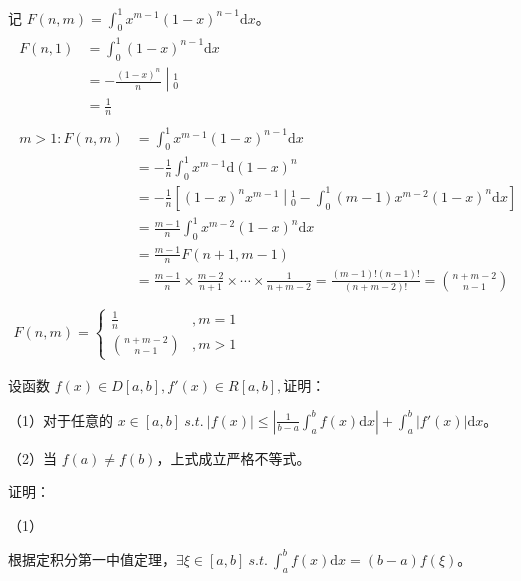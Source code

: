 记 $\displaystyle F( n,m) =\int _{0}^{1} x^{m-1}( 1-x)^{n-1}\mathrm{d} x$。
\begin{gather*}
	\begin{aligned}
		F( n,1) & =\int _{0}^{1}( 1-x)^{n-1}\mathrm{d} x\\
		& =\left. -\frac{( 1-x)^{n}}{n}\middle| _{0}^{1}\right. \\
		& =\frac{1}{n}
	\end{aligned}\\
	\begin{aligned}
		m >1:F( n,m) & =\int _{0}^{1} x^{m-1}( 1-x)^{n-1}\mathrm{d} x\\
		& =-\frac{1}{n}\int _{0}^{1} x^{m-1}\mathrm{d}( 1-x)^{n}\\
		& =-\frac{1}{n}\left[\left. ( 1-x)^{n} x^{m-1}\middle| _{0}^{1}\right. -\int _{0}^{1}( m-1) x^{m-2}( 1-x)^{n}\mathrm{d} x\right]\\
		& =\frac{m-1}{n}\int _{0}^{1} x^{m-2}( 1-x)^{n}\mathrm{d} x\\
		& =\frac{m-1}{n} F( n+1,m-1)\\
		& =\frac{m-1}{n} \times \frac{m-2}{n+1} \times \cdots \times \frac{1}{n+m-2} =\frac{( m-1) !( n-1) !}{( n+m-2) !} =\binom{n+m-2}{n-1}
	\end{aligned}\\
	\\
	F( n,m) =\begin{cases}
		\frac{1}{n} & ,m=1\\
		\binom{n+m-2}{n-1} & ,m >1
	\end{cases}
\end{gather*}




\begin{ques}
	设函数 $\displaystyle f( x) \in D[ a,b] ,f'( x) \in R[ a,b] ,$证明：

（1）对于任意的 $\displaystyle x\in [ a,b] \ s.t.\ |f( x) |\leqslant \left| \frac{1}{b-a}\int _{a}^{b} f( x)\mathrm{d} x\right| +\int _{a}^{b} |f'( x) |\mathrm{d} x$。

（2）当 $\displaystyle f( a) \neq f( b)$，上式成立严格不等式。

\end{ques}


证明：



（1）

根据定积分第一中值定理，$\displaystyle \exists \xi \in [ a,b] \ s.t.\ \int _{a}^{b} f( x)\mathrm{d} x=( b-a) f( \xi )$。

